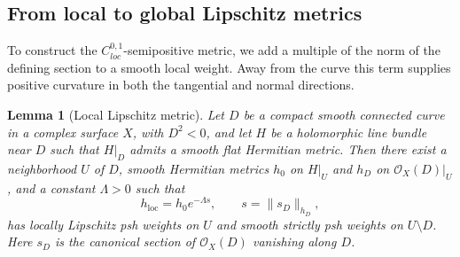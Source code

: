 \documentclass[11pt]{amsart}
\newtheorem{lemma}[theorem]{Lemma}
\theoremstyle{definition}
\theoremstyle{remark}
\numberwithin{equation}{section}
\newcommand{\OO}{\mathcal O}
\begin{document}
\subsection{From local to global Lipschitz metrics}\label{sec:cusp}

To construct the $C^{0,1}_{loc}$-semipositive metric, we add a multiple of the
norm of the defining section to a smooth local weight. Away from the
curve this term supplies positive curvature in both the tangential and
normal directions.

\begin{lemma}[Local Lipschitz metric]\label{lem:cusp}
Let $D$ be a compact smooth connected curve in a complex
surface $X$, with $D^2<0$, and let $H$ be a holomorphic line
bundle near $D$ such that $H|_D$ admits a smooth flat
Hermitian metric. Then there exist a neighborhood $U$ of $D$,
smooth Hermitian metrics $h_0$ on $H|_U$ and $h_D$ on
$\OO_X(D)|_U$, and a constant $\Lambda>0$ such that
\[
 h_{\mathrm{loc}}=h_0e^{-\Lambda s},
 \qquad s=\|s_D\|_{h_D},
\]
has locally Lipschitz psh weights on $U$ and smooth strictly
psh weights on $U\setminus D$. Here $s_D$ is the canonical
section of $\OO_X(D)$ vanishing along $D$.
\end{lemma}
\end{document}
